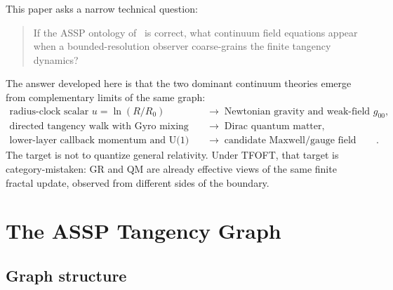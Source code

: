 \documentclass[11pt,a4paper]{article}
\begin{document}
This paper asks a narrow technical question:
\begin{quote}
If the ASSP ontology of~\cite{TFOFT2026} is correct, what continuum field
equations appear when a bounded-resolution observer coarse-grains the finite
tangency dynamics?
\end{quote}
The answer developed here is that the two dominant continuum theories emerge
from complementary limits of the same graph:
\begin{align*}
\text{radius-clock scalar }u=\ln(R/R_0)
  &\;\longrightarrow\; \text{Newtonian gravity and weak-field }g_{00},\\
\text{directed tangency walk with Gyro mixing}
  &\;\longrightarrow\; \text{Dirac quantum matter},\\
\text{lower-layer callback momentum and U(1) holonomies}
  &\;\longrightarrow\; \text{candidate Maxwell/gauge field limit}.
\end{align*}
The target is not to quantize general relativity. Under TFOFT, that target is
category-mistaken: GR and QM are already effective views of the same finite
fractal update, observed from different sides of the boundary.

\section{The ASSP Tangency Graph}

\subsection{Graph structure}
\end{document}
